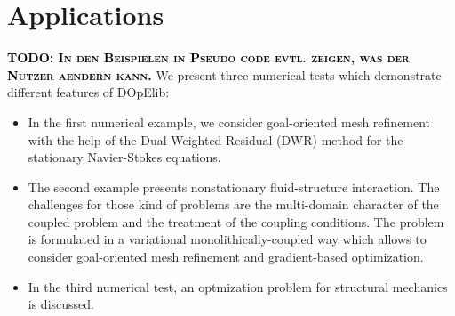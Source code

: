 \documentclass[prodmode,acmtoms]{acmsmall}
\numberwithin{equation}{section}
\newcommand{\todo}[1]{\textbf{\textsc{\textcolor{black}{TODO: #1}}}}
\begin{document}
%
%
%
%
%
%
%
\section{Applications}
\label{applications}
\todo{In den Beispielen in Pseudo code evtl. zeigen, was der 
Nutzer aendern kann.}
We present three numerical tests which demonstrate different
features of DOpElib:
\begin{itemize}
\item In the first numerical example, we consider 
goal-oriented mesh refinement with the help of the 
Dual-Weighted-Residual (DWR) method for the stationary Navier-Stokes equations.
\item The second example presents nonstationary fluid-structure 
interaction. The challenges for those kind of problems are the multi-domain
character of the coupled problem and the treatment of the coupling conditions.
The problem is formulated in a variational monolithically-coupled way which 
allows to consider goal-oriented mesh refinement and gradient-based optimization.
\item In the third numerical test, an optmization problem for structural mechanics
is discussed.
\end{itemize}
\end{document}
